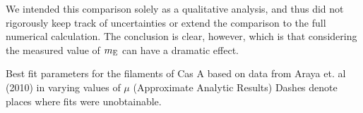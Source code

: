 \documentclass[12pt,preprint]{aastex}  %
\begin{document}
We intended this comparison solely as a qualitative analysis, and thus did not
rigorously keep track of uncertainties or extend the comparison to the full
numerical calculation. The conclusion is clear, however, which is that
considering the measured value of $m_{\rm E}$ can have a dramatic effect.

\begin{table}[h]
\tiny
\centering
\caption{Best fit parameters for the filaments of Cas A based on data from
Araya et. al (2010) in varying values of $\mu$ (Approximate Analytic Results)
Dashes denote places where fits were unobtainable.
\label{tab:araya}}

\end{table}



\end{document}
